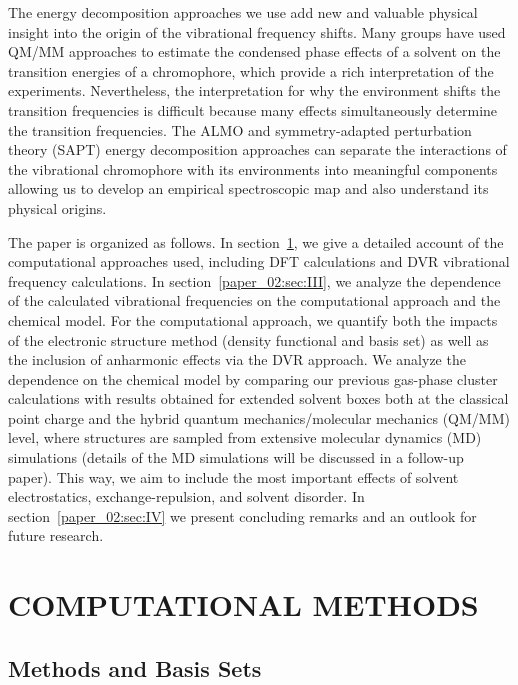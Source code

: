 \documentclass[%
  class = book,%
  crop = false,%
  float = true,%
  multi = true,%
  preview = false,%
]{standalone}
\let\cite\autocite
\newcommand{\caps}[1]{\uppercase{#1}}
\begin{document}
The energy decomposition approaches we use add new and valuable physical insight into the origin of the vibrational frequency shifts. Many groups have used QM/MM approaches to estimate the condensed phase effects of a solvent on the transition energies of a chromophore, which provide a rich interpretation of the experiments\cite{choiJCP-08,Lindquist2008,Terranova2014,liJPC-06,Schmidt2008}. Nevertheless, the interpretation for why the environment shifts the transition frequencies is difficult because many effects simultaneously determine the transition frequencies. The ALMO and symmetry-adapted perturbation theory (SAPT) energy decomposition approaches can separate the interactions of the vibrational chromophore with its environments into meaningful components allowing us to develop an empirical spectroscopic map and also understand its physical origins.

The paper is organized as follows. In section~\ref{paper_02:sec:II}, we give a detailed account of the computational approaches used, including DFT calculations and DVR vibrational frequency calculations. In section~\ref{paper_02:sec:III}, we analyze the dependence of the calculated  vibrational frequencies on the computational approach and the chemical model. For the computational approach, we quantify both the impacts of the electronic structure method (density functional and basis set) as well as the inclusion of anharmonic effects via the DVR approach. We analyze the dependence on the chemical model by comparing our previous gas-phase cluster calculations with results obtained for extended solvent boxes both at the classical point charge and the hybrid quantum mechanics/molecular mechanics (QM/MM) level, where structures are sampled from extensive molecular dynamics (MD) simulations (details of the MD simulations will be discussed in a follow-up paper\cite{Daly2016}). This way, we aim to include the most important effects of solvent electrostatics, exchange-repulsion, and solvent disorder. In section~\ref{paper_02:sec:IV} we present concluding remarks and an outlook for future research.

\section{\texorpdfstring{\caps{Computational Methods}}{Computational Methods}}
\label{paper_02:sec:II}

\subsection{Methods and Basis Sets}
\label{paper_02:ssec:IIA}
\end{document}
